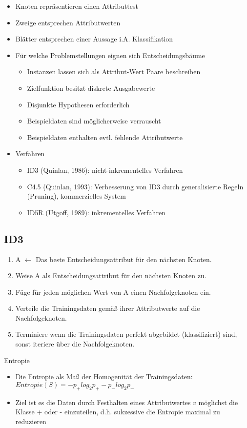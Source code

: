 \documentclass[paper=a4, fontsize=11pt]{scrartcl} %
\numberwithin{equation}{section} %
\numberwithin{figure}{section} %
\numberwithin{table}{section} %
\begin{document}
\begin{itemize}
\item Knoten repräsentieren einen Attributtest
\item Zweige entsprechen Attributwerten
\item Blätter entsprechen einer Aussage i.A. Klassifikation
\item Für welche Problemstellungen eignen sich Entscheidungsbäume
\begin{itemize}
\item Instanzen lassen sich als Attribut-Wert Paare beschreiben
\item Zielfunktion besitzt diskrete Ausgabewerte
\item Disjunkte Hypothesen erforderlich
\item Beispieldaten sind möglicherweise verrauscht
\item Beispieldaten enthalten evtl. fehlende Attributwerte
\end{itemize}
\item Verfahren
\begin{itemize}
\item ID3 (Quinlan, 1986): nicht-inkrementelles Verfahren
\item C4.5 (Quinlan, 1993): Verbesserung von ID3 durch generalisierte Regeln (Pruning), kommerzielles System
\item ID5R (Utgoff, 1989): inkrementelles Verfahren
\end{itemize}
\end{itemize}

\subsection{ID3}

\begin{enumerate}
\item A $\leftarrow$ Das beste Entscheidungsattribut für den nächsten Knoten.
\item Weise A als Entscheidungsattribut für den nächsten Knoten zu.
\item Füge für jeden möglichen Wert von A einen Nachfolgeknoten ein.
\item Verteile die Trainingsdaten gemäß ihrer Attributwerte auf die Nachfolgeknoten.
\item Terminiere wenn die Trainingsdaten perfekt abgebildet (klassifiziert) sind, sonst iteriere über die Nachfolgeknoten.
\end{enumerate}

Entropie
\begin{itemize}
\item Die Entropie als Maß der Homogenität der Trainingsdaten: $Entropie(S) = -p_+ log_2 p_{+} - p_- log_2 p_-$
\item Ziel ist es die Daten durch Festhalten eines Attributwertes $v$ möglichst die Klasse + oder - einzuteilen, d.h. sukzessive die Entropie maximal zu reduzieren
\end{itemize}
\end{document}
